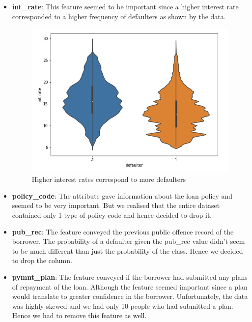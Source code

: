 \documentclass[conference]{IEEEtran}
\begin{document}
\begin{itemize}
    \item {\bf int\_rate}: This feature seemed to be important since a higher
        interest rate corresponded to a higher frequency of defaulters as
        shown by the data.

        \begin{figure}[ht]
        \center\includegraphics[scale=0.3]{int_rate}
            \caption{Higher interest rates correspond to more defaulters}
        \end{figure}

    \item {\bf policy\_code}: The attribute gave information about the loan
        policy and seemed to be very important. But we realised that the entire
        dataset contained only 1 type of policy code and hence decided to drop
        it.

    \item {\bf pub\_rec}: The feature conveyed the previous public offence
        record of the borrower. The probability of a defaulter given the
        pub\_rec value didn't seem to be much different than just the
        probability of the class. Hence we decided to drop the column.

    \item {\bf pymnt\_plan}: The feature conveyed if the borrower had submitted
        any plans of repayment of the loan. Although the feature seemed
        important since a plan would translate to greater confidence in the
        borrower. Unfortunately, the data was highly skewed and we had only
        10 people who had submitted a plan. Hence we had to remove this
        feature as well.


\end{itemize}
\end{document}
